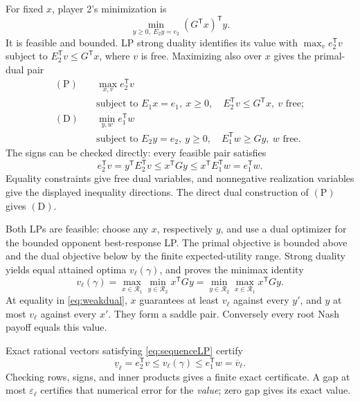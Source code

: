 \documentclass[11pt,a4paper]{article}
\numberwithin{equation}{section}
\theoremstyle{definition}
\begin{document}
For fixed \(x\), player 2's minimization is
\[
 \min_{y\ge0,\ E_2y=e_2}(G^{\mathsf T}x)^{\mathsf T}y .
\]
It is feasible and bounded. LP strong duality identifies its value
with \(\max_v e_2^{\mathsf T}v\) subject to
\(E_2^{\mathsf T}v\le G^{\mathsf T}x\), where \(v\) is free.
Maximizing also over \(x\) gives the primal-dual pair
\begin{equation}\label{eq:sequenceLP}
 \begin{aligned}
 (\mathrm P)\quad&\max_{x,v} e_2^{\mathsf T}v\\
 &\text{subject to }E_1x=e_1,\ x\ge0,\quad
        E_2^{\mathsf T}v\le G^{\mathsf T}x,\ v\text{ free};\\[3pt]
 (\mathrm D)\quad&\min_{y,w} e_1^{\mathsf T}w\\
 &\text{subject to }E_2y=e_2,\ y\ge0,\quad
        E_1^{\mathsf T}w\ge Gy,\ w\text{ free}.
 \end{aligned}
\end{equation}
The signs can be checked directly: every feasible pair satisfies
\begin{equation}\label{eq:weakdual}
 e_2^{\mathsf T}v
   =y^{\mathsf T}E_2^{\mathsf T}v
   \le x^{\mathsf T}Gy
   \le x^{\mathsf T}E_1^{\mathsf T}w
   =e_1^{\mathsf T}w .
\end{equation}
Equality constraints give free dual variables, and nonnegative
realization variables give the displayed inequality directions.
The direct dual construction of \((\mathrm P)\) gives
\((\mathrm D)\).

Both LPs are feasible: choose any \(x\), respectively \(y\), and use
a dual optimizer for the bounded opponent best-response LP.
The primal objective is bounded above and the dual objective below
by the finite expected-utility range.
Strong duality yields equal attained optima \(v_\ell(\gamma)\),
and proves the minimax identity
\begin{equation}\label{eq:minimax}
 v_\ell(\gamma)
 =\max_{x\in\mathcal R_1}\min_{y\in\mathcal R_2}x^{\mathsf T}Gy
 =\min_{y\in\mathcal R_2}\max_{x\in\mathcal R_1}x^{\mathsf T}Gy .
\end{equation}
At equality in \eqref{eq:weakdual}, \(x\) guarantees at least \(v_\ell\)
against every \(y'\), and \(y\) at most \(v_\ell\) against every \(x'\).
They form a saddle pair. Conversely every root Nash payoff equals
this value.

Exact rational vectors satisfying \eqref{eq:sequenceLP} certify
\begin{equation}\label{eq:valuecertificate}
 \underline v_\ell=e_2^{\mathsf T}v
       \le v_\ell(\gamma)\le e_1^{\mathsf T}w=\overline v_\ell .
\end{equation}
Checking rows, signs, and inner products gives a finite exact
certificate. A gap at most \(\varepsilon_\ell\) certifies that
numerical error for the \emph{value}; zero gap gives its exact value.
\end{document}
